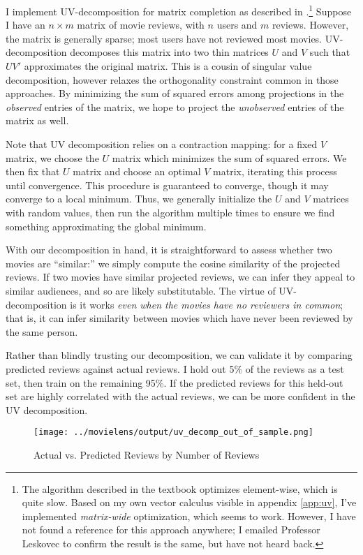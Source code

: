 \documentclass{article}
\begin{document}
I implement UV-decomposition for matrix completion as described in \textcite{leskovec2020MMD}.\footnote{The algorithm described in the textbook optimizes element-wise, which is quite slow. Based on my own vector calculus visible in appendix \ref{app:uv}, I've implemented \emph{matrix-wide} optimization, which seems to work. However, I have not found a reference for this approach anywhere; I emailed Professor Leskovec to confirm the result is the same, but have not heard back.} Suppose I have an $n \times m$ matrix of movie reviews, with $n$ users and $m$ reviews. However, the matrix is generally sparse; most users have not reviewed most movies. UV-decomposition decomposes this matrix into two thin matrices $U$ and $V$ such that $UV'$ approximates the original matrix. This is a cousin of singular value decomposition, however relaxes the orthogonality constraint common in those approaches. By minimizing the sum of squared errors among projections in the \emph{observed} entries of the matrix, we hope to project the \emph{unobserved} entries of the matrix as well. 

Note that UV decomposition relies on a contraction mapping: for a fixed $V$ matrix, we choose the $U$ matrix which minimizes the sum of squared errors. We then fix that $U$ matrix and choose an optimal $V$ matrix, iterating this process until convergence. This procedure is guaranteed to converge, though it may converge to a local minimum. Thus, we generally initialize the $U$ and $V$ matrices with random values, then run the algorithm multiple times to ensure we find something approximating the global minimum. 

With our decomposition in hand, it is straightforward to assess whether two movies are ``similar:'' we simply compute the cosine similarity of the projected reviews. If two movies have similar projected reviews, we can infer they appeal to similar audiences, and so are likely substitutable. The virtue of UV-decomposition is it works \emph{even when the movies have no reviewers in common}; that is, it can infer similarity between movies which have never been reviewed by the same person.

Rather than blindly trusting our decomposition, we can validate it by comparing predicted reviews against actual reviews. I hold out 5\% of the reviews as a test set, then train on the remaining 95\%. If the predicted reviews for this held-out set are highly correlated with the actual reviews, we can be more confident in the UV decomposition.

\begin{figure}
    \begin{center}
    \texttt{[image: ../movielens/output/uv\_decomp\_out\_of\_sample.png]}
    \caption{Actual vs. Predicted Reviews by Number of Reviews}
    \label{fig:actual_vs_predicted}
    \end{center}
\end{figure}
\end{document}
